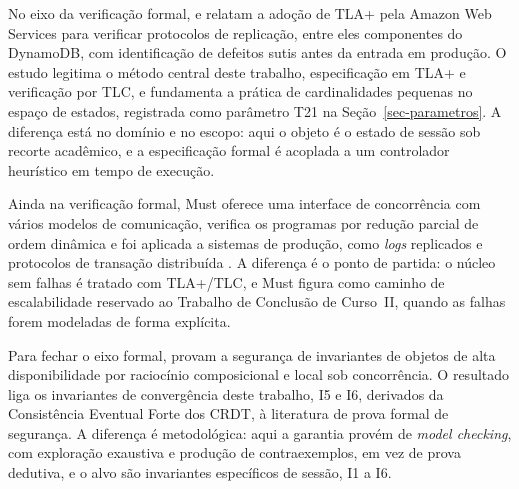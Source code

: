 No eixo da verificação formal, \citet{newcombe_aws_tla_2014} e \citet{newcombe_aws_formal_methods_2015} relatam a adoção de TLA+ pela Amazon Web Services para verificar protocolos de replicação, entre eles componentes do DynamoDB, com identificação de defeitos sutis antes da entrada em produção. O estudo legitima o método central deste trabalho, especificação em TLA+ e verificação por TLC, e fundamenta a prática de cardinalidades pequenas no espaço de estados, registrada como parâmetro T21 na Seção~\ref{sec-parametros}. A diferença está no domínio e no escopo: aqui o objeto é o estado de sessão sob recorte acadêmico, e a especificação formal é acoplada a um controlador heurístico em tempo de execução.

Ainda na verificação formal, Must oferece uma interface de concorrência com vários modelos de comunicação, verifica os programas por redução parcial de ordem dinâmica e foi aplicada a sistemas de produção, como \emph{logs} replicados e protocolos de transação distribuída \citep{enea_must_2024}. A diferença é o ponto de partida: o núcleo sem falhas é tratado com TLA+/TLC, e Must figura como caminho de escalabilidade reservado ao Trabalho de Conclusão de Curso~II, quando as falhas forem modeladas de forma explícita. 

Para fechar o eixo formal, \citet{nair_safety_distributed_2020} provam a segurança de invariantes de objetos de alta disponibilidade por raciocínio composicional e local sob concorrência. O resultado liga os invariantes de convergência deste trabalho, I5 e I6, derivados da Consistência Eventual Forte dos CRDT, à literatura de prova formal de segurança. A diferença é metodológica: aqui a garantia provém de \emph{model checking}, com exploração exaustiva e produção de contraexemplos, em vez de prova dedutiva, e o alvo são invariantes específicos de sessão, I1 a I6.

